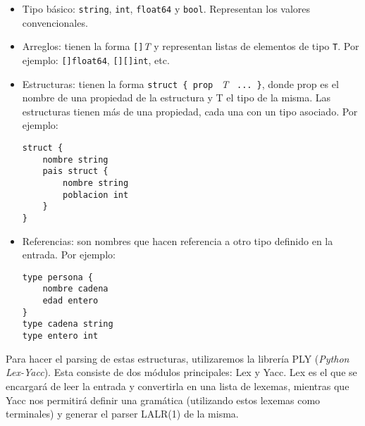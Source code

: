 \begin{itemize}
    \item Tipo básico: \texttt{string}, \texttt{int}, \texttt{float64} y \texttt{bool}. Representan los valores convencionales.
    \item Arreglos: tienen la forma \texttt{[]}\textit{T} y representan listas de elementos de tipo \texttt{T}. Por ejemplo: \texttt{[]float64}, \texttt{[][]int}, etc. 
    \item Estructuras: tienen la forma \texttt{struct \{ prop } \textit{T} \texttt{ ... \}}, donde prop es el nombre de una propiedad de la estructura y T el tipo de la misma. Las estructuras tienen más de una propiedad, cada una con un tipo asociado. Por ejemplo:
    \begin{verbatim}
struct {
    nombre string
    pais struct {
        nombre string
        poblacion int
    }
}
    \end{verbatim}
    \item Referencias: son nombres que hacen referencia a otro tipo definido en la entrada. Por ejemplo:
    \begin{verbatim}
type persona {
    nombre cadena
    edad entero
}
type cadena string
type entero int
    \end{verbatim}
\end{itemize}

Para hacer el parsing de estas estructuras, utilizaremos la librería PLY (\textit{Python Lex-Yacc}). Esta consiste de dos módulos principales: Lex y Yacc. Lex es el que se encargará de leer la entrada y convertirla en una lista de lexemas, mientras que Yacc nos permitirá definir una gramática (utilizando estos lexemas como terminales) y generar el parser LALR(1) de la misma.



